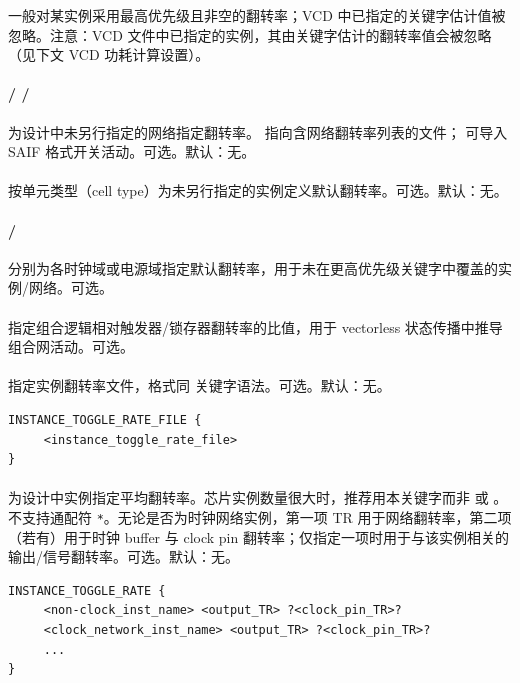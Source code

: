 一般对某实例采用最高优先级且非空的翻转率；VCD 中已指定的关键字估计值被忽略。注意：VCD 文件中已指定的实例，其由关键字估计的翻转率值会被忽略（见下文 VCD 功耗计算设置）。
\paragraph{ /  / }
为设计中未另行指定的网络指定翻转率。 指向含网络翻转率列表的文件； 可导入 SAIF 格式开关活动。可选。默认：无。

\paragraph{}
按单元类型（cell type）为未另行指定的实例定义默认翻转率。可选。默认：无。

\paragraph{ / }
分别为各时钟域或电源域指定默认翻转率，用于未在更高优先级关键字中覆盖的实例/网络。可选。

\paragraph{}
指定组合逻辑相对触发器/锁存器翻转率的比值，用于 vectorless 状态传播中推导组合网活动。可选。


\paragraph{}
指定实例翻转率文件，格式同  关键字语法。可选。默认：无。
\begin{lstlisting}
INSTANCE_TOGGLE_RATE_FILE {
     <instance_toggle_rate_file>
}
\end{lstlisting}

\paragraph{}
为设计中实例指定平均翻转率。芯片实例数量很大时，推荐用本关键字而非  或 。不支持通配符 \texttt{*}。无论是否为时钟网络实例，第一项 TR 用于网络翻转率，第二项（若有）用于时钟 buffer 与 clock pin 翻转率；仅指定一项时用于与该实例相关的输出/信号翻转率。可选。默认：无。
\begin{lstlisting}
INSTANCE_TOGGLE_RATE {
     <non-clock_inst_name> <output_TR> ?<clock_pin_TR>?
     <clock_network_inst_name> <output_TR> ?<clock_pin_TR>?
     ...
}
\end{lstlisting}

